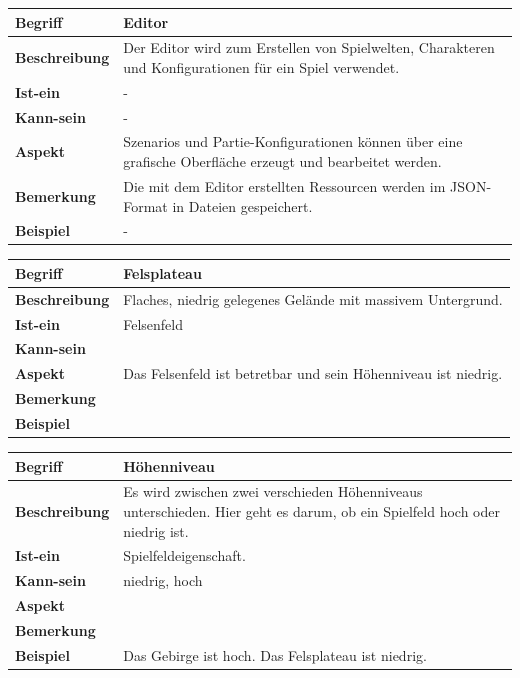 \documentclass[12pt]{article}
\begin{document}
\begin{tabularx}{\linewidth}{|l|X|}
\hline
\textbf{Begriff} & \textbf{Editor} \\
\hline
\textbf{Beschreibung} & Der Editor wird zum Erstellen von Spielwelten, Charakteren und Konfigurationen für ein Spiel verwendet. \\
\hline
\textbf{Ist-ein} & - \\
\hline
\textbf{Kann-sein} & - \\
\hline
\textbf{Aspekt} & Szenarios und Partie-Konfigurationen können über eine grafische Oberfläche erzeugt und bearbeitet werden. \\
\hline
\textbf{Bemerkung} & Die mit dem Editor erstellten Ressourcen werden im JSON-Format in Dateien gespeichert. \\
\hline
\textbf{Beispiel} & - \\
\hline
\end{tabularx}

\begin{tabularx}{\linewidth}{|l|X|}
\hline
\textbf{Begriff} & \textbf{Felsplateau} \\
\hline
\textbf{Beschreibung} & Flaches, niedrig gelegenes Gelände mit massivem Untergrund. \\
\hline
\textbf{Ist-ein} & Felsenfeld\\
\hline
\textbf{Kann-sein} & \\
\hline
\textbf{Aspekt} & Das Felsenfeld ist betretbar und sein Höhenniveau ist niedrig.\\
\hline
\textbf{Bemerkung} &  \\
\hline
\textbf{Beispiel} &  \\
\hline
\end{tabularx}

\begin{tabularx}{\linewidth}{|l|X|}
\hline
\textbf{Begriff} & \textbf{Höhenniveau} \\
\hline
\textbf{Beschreibung} & Es wird zwischen zwei verschieden Höhenniveaus unterschieden. Hier geht es darum, ob ein Spielfeld hoch oder niedrig ist. \\
\hline
\textbf{Ist-ein} & Spielfeldeigenschaft. \\
\hline
\textbf{Kann-sein} & niedrig, hoch\\
\hline
\textbf{Aspekt} &  \\
\hline
\textbf{Bemerkung} &  \\
\hline
\textbf{Beispiel} & Das Gebirge ist hoch. Das Felsplateau ist niedrig. \\
\hline
\end{tabularx}
\end{document}
